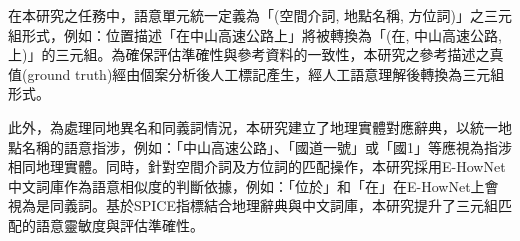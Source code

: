 在本研究之任務中，語意單元統一定義為「(空間介詞, 地點名稱, 方位詞)」之三元組形式，例如：位置描述「在中山高速公路上」將被轉換為「(在, 中山高速公路, 上)」的三元組。為確保評估準確性與參考資料的一致性，本研究之參考描述之真值(ground truth)經由個案分析後人工標記產生，經人工語意理解後轉換為三元組形式。

此外，為處理同地異名和同義詞情況，本研究建立了地理實體對應辭典，以統一地點名稱的語意指涉，例如：「中山高速公路」、「國道一號」或「國1」等應視為指涉相同地理實體。同時，針對空間介詞及方位詞的匹配操作，本研究採用E-HowNet中文詞庫作為語意相似度的判斷依據，例如：「位於」和「在」在E-HowNet上會視為是同義詞。基於SPICE指標結合地理辭典與中文詞庫，本研究提升了三元組匹配的語意靈敏度與評估準確性。


